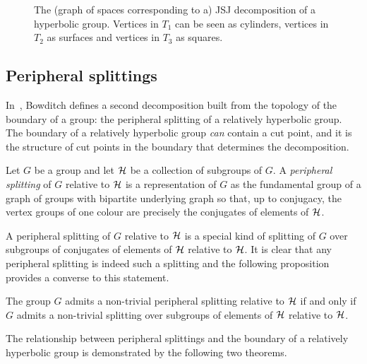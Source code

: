 \begin{figure}
\begin{center}
  
\end{center}
\caption{\label{figure:JSJdecomposition} 
  The (graph of spaces corresponding to a) JSJ decomposition of a hyperbolic group. 
  Vertices in $T_1$ can be seen as cylinders, vertices in $T_2$ as surfaces and vertices in $T_3$ as squares.}
\end{figure}

\subsection{Peripheral splittings}\label{section:peripheral_splittings}

In~\cite{bowditch01,bowditch99b}, Bowditch defines a second decomposition built from the topology of the boundary of a group: the peripheral splitting of a relatively hyperbolic group.
The boundary of a relatively hyperbolic group \emph{can} contain a cut point, and it is the structure of cut points in the boundary that determines the decomposition.

\begin{definition} Let $G$ be a group and let $\mathcal{H}$ be a collection of subgroups of $G$.
  A \emph{peripheral splitting} of $G$ relative to $\mathcal{H}$ is a representation of $G$ as the fundamental group of a graph of groups with bipartite underlying graph so that, up to conjugacy, the vertex groups of one colour are precisely the conjugates of elements of $\mathcal{H}$.
\end{definition}

A peripheral splitting of $G$ relative to $\mathcal{H}$ is a special kind of splitting of $G$ over subgroups of conjugates of elements of $\mathcal{H}$ relative to $\mathcal{H}$.
It is clear that any peripheral splitting is indeed such a splitting and the following proposition provides a converse to this statement.

\begin{proposition}\cite[Proposition 5.1]{bowditch01}
  The group $G$ admits a non-trivial peripheral splitting relative to $\mathcal{H}$ if and only if $G$ admits a non-trivial splitting over subgroups of elements of $\mathcal{H}$ relative to $\mathcal{H}$.
\end{proposition}

The relationship between peripheral splittings and the boundary of a relatively hyperbolic group is demonstrated by the following two theorems.

